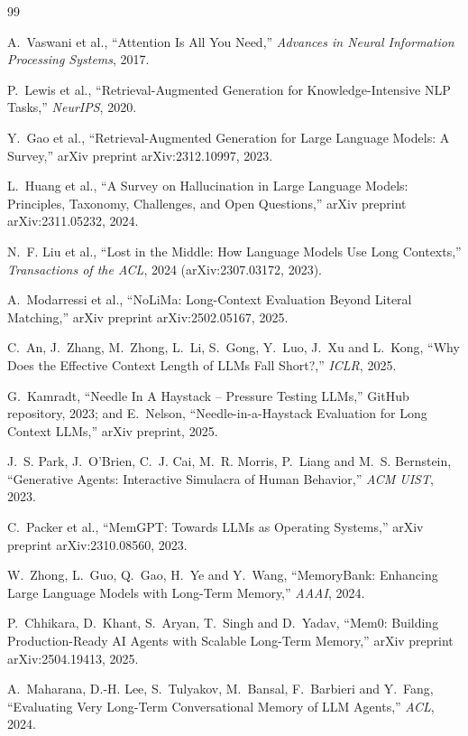 \begin{thebibliography}{99}

 A.~Vaswani et al., ``Attention Is All You Need,'' \emph{Advances in Neural Information
Processing Systems}, 2017.

 P.~Lewis et al., ``Retrieval-Augmented Generation for Knowledge-Intensive NLP Tasks,''
\emph{NeurIPS}, 2020.

 Y.~Gao et al., ``Retrieval-Augmented Generation for Large Language Models: A Survey,''
arXiv preprint arXiv:2312.10997, 2023.

 L.~Huang et al., ``A Survey on Hallucination in Large Language Models: Principles,
Taxonomy, Challenges, and Open Questions,'' arXiv preprint arXiv:2311.05232, 2024.

 N.~F. Liu et al., ``Lost in the Middle: How Language Models Use Long Contexts,''
\emph{Transactions of the ACL}, 2024 (arXiv:2307.03172, 2023).

 A.~Modarressi et al., ``NoLiMa: Long-Context Evaluation Beyond Literal Matching,''
arXiv preprint arXiv:2502.05167, 2025.

 C.~An, J.~Zhang, M.~Zhong, L.~Li, S.~Gong, Y.~Luo, J.~Xu and L.~Kong, ``Why Does the
Effective Context Length of LLMs Fall Short?,'' \emph{ICLR}, 2025.

 G.~Kamradt, ``Needle In A Haystack -- Pressure Testing LLMs,'' GitHub repository, 2023;
and E.~Nelson, ``Needle-in-a-Haystack Evaluation for Long Context LLMs,'' arXiv preprint, 2025.

 J.~S. Park, J.~O'Brien, C.~J. Cai, M.~R. Morris, P.~Liang and M.~S. Bernstein,
``Generative Agents: Interactive Simulacra of Human Behavior,'' \emph{ACM UIST}, 2023.

 C.~Packer et al., ``MemGPT: Towards LLMs as Operating Systems,'' arXiv preprint
arXiv:2310.08560, 2023.

 W.~Zhong, L.~Guo, Q.~Gao, H.~Ye and Y.~Wang, ``MemoryBank: Enhancing Large Language
Models with Long-Term Memory,'' \emph{AAAI}, 2024.

 P.~Chhikara, D.~Khant, S.~Aryan, T.~Singh and D.~Yadav, ``Mem0: Building Production-Ready AI
Agents with Scalable Long-Term Memory,'' arXiv preprint arXiv:2504.19413, 2025.

 A.~Maharana, D.-H. Lee, S.~Tulyakov, M.~Bansal, F.~Barbieri and Y.~Fang, ``Evaluating Very
Long-Term Conversational Memory of LLM Agents,'' \emph{ACL}, 2024.


\end{thebibliography}
